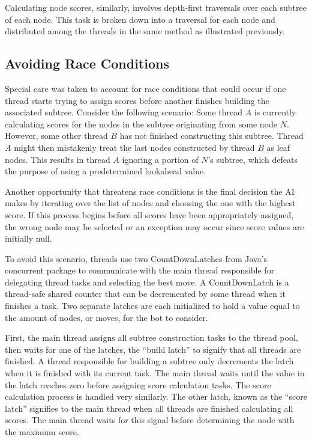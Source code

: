 \documentclass[conference]{IEEEtran}
\begin{document}
Calculating node scores, similarly, involves depth-first traversals over each subtree of each node. This task is broken down into a traversal for each node and distributed among the threads in the same method as illustrated previously.


\subsection{Avoiding Race Conditions}
Special care was taken to account for race conditions that could occur if one thread starts trying to assign scores before another finishes building the associated subtree. Consider the following scenario: Some thread $A$ is currently calculating scores for the nodes in the subtree originating from some node $N$. However, some other thread $B$ has not finished constructing this subtree. Thread $A$ might then mistakenly treat the last nodes constructed by thread $B$ as leaf nodes. This results in thread $A$ ignoring a portion of $N$’s subtree, which defeats the purpose of using a predetermined lookahead value.

Another opportunity that threatens race conditions is the final decision the AI makes by iterating over the list of nodes and choosing the one with the highest score. If this process begins before all scores have been appropriately assigned, the wrong node may be selected or an exception may occur since score values are initially null.

To avoid this scenario, threads use two CountDownLatches from Java’s concurrent package to communicate with the main thread responsible for delegating thread tasks and selecting the best move. A CountDownLatch is a thread-safe shared counter that can be decremented by some thread when it finishes a task. Two separate latches are each initialized to hold a value equal to the amount of nodes, or moves, for the bot to consider.

First, the main thread assigns all subtree construction tasks to the thread pool, then waits for one of the latches, the “build latch” to signify that all threads are finished. A thread responsible for building a subtree only decrements the latch when it is finished with its current task. The main thread waits until the value in the latch reaches zero before assigning score calculation tasks.
The score calculation process is handled very similarly. The other latch, known as the “score latch” signifies to the main thread when all threads are finished calculating all scores. The main thread waits for this signal before determining the node with the maximum score.
\end{document}
